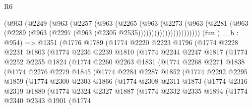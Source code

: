 \begin{lexlean}{R6}
\begin{coremodule}
                  (@963
                    (@2249
                      (@963
                        (@2257
                          (@963
                            (@2265
                              (@963
                                (@2273
                                  (@963
                                    (@2281
                                      (@963
                                        (@2289
                                          (@963 (@2297 (@963 (@2305 @2535)))))))))))))))))))))))
    (fun (__b : @954) =>
    @1351
      (@1776
        @1789
        (@1774
          @2220
          @2223
          @1796
          (@1774
            @2228
            @2231
            @1803
            (@1774
              @2236
              @2239
              @1810
              (@1774
                @2244
                @2247
                @1817
                (@1774
                  @2252
                  @2255
                  @1824
                  (@1774
                    @2260
                    @2263
                    @1831
                    (@1774
                      @2268
                      @2271
                      @1838
                      (@1774
                        @2276
                        @2279
                        @1845
                        (@1774
                          @2284
                          @2287
                          @1852
                          (@1774
                            @2292
                            @2295
                            @1859
                            (@1774
                              @2300
                              @2303
                              @1866
                              (@1774
                                @2308
                                @2311
                                @1873
                                (@1774
                                  @2316
                                  @2319
                                  @1880
                                  (@1774
                                    @2324
                                    @2327
                                    @1887
                                    (@1774
                                      @2332
                                      @2335
                                      @1894
                                      (@1774
                                        @2340
                                        @2343
                                        @1901
                                        (@1774

\end{coremodule}
\end{lexlean}
